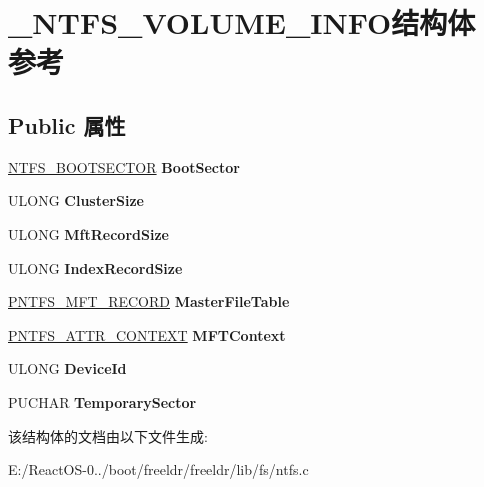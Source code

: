 \hypertarget{struct___n_t_f_s___v_o_l_u_m_e___i_n_f_o}{}\section{\+\_\+\+N\+T\+F\+S\+\_\+\+V\+O\+L\+U\+M\+E\+\_\+\+I\+N\+F\+O结构体 参考}
\label{struct___n_t_f_s___v_o_l_u_m_e___i_n_f_o}
\subsection*{Public 属性}
\begin{DoxyCompactItemize}
\item 
\mbox{\label{struct___n_t_f_s___v_o_l_u_m_e___i_n_f_o_a1f50e40fe047ed091af4987f1a5f62ff}} 
\hyperlink{struct_n_t_f_s___b_o_o_t_s_e_c_t_o_r}{N\+T\+F\+S\+\_\+\+B\+O\+O\+T\+S\+E\+C\+T\+OR} {\bfseries Boot\+Sector}
\item 
\mbox{\label{struct___n_t_f_s___v_o_l_u_m_e___i_n_f_o_a737b6b21c92ce01ef75723857d81515d}} 
U\+L\+O\+NG {\bfseries Cluster\+Size}
\item 
\mbox{\label{struct___n_t_f_s___v_o_l_u_m_e___i_n_f_o_aae548fc3de728c495db76405b8d2fc82}} 
U\+L\+O\+NG {\bfseries Mft\+Record\+Size}
\item 
\mbox{\label{struct___n_t_f_s___v_o_l_u_m_e___i_n_f_o_aed40cec4d44eb49248e21930890c8e4d}} 
U\+L\+O\+NG {\bfseries Index\+Record\+Size}
\item 
\mbox{\label{struct___n_t_f_s___v_o_l_u_m_e___i_n_f_o_a9f636c34358ca9592a69aff47c3c5581}} 
\hyperlink{struct_n_t_f_s___m_f_t___r_e_c_o_r_d}{P\+N\+T\+F\+S\+\_\+\+M\+F\+T\+\_\+\+R\+E\+C\+O\+RD} {\bfseries Master\+File\+Table}
\item 
\mbox{\label{struct___n_t_f_s___v_o_l_u_m_e___i_n_f_o_ac184a861069af2ccdecb8f5418b99773}} 
\hyperlink{struct_n_t_f_s___a_t_t_r___c_o_n_t_e_x_t}{P\+N\+T\+F\+S\+\_\+\+A\+T\+T\+R\+\_\+\+C\+O\+N\+T\+E\+XT} {\bfseries M\+F\+T\+Context}
\item 
\mbox{\label{struct___n_t_f_s___v_o_l_u_m_e___i_n_f_o_ac14bf62be01129bd38366ece09b56280}} 
U\+L\+O\+NG {\bfseries Device\+Id}
\item 
\mbox{\label{struct___n_t_f_s___v_o_l_u_m_e___i_n_f_o_a0acc67f8f47982004c4475c2cd419d66}} 
P\+U\+C\+H\+AR {\bfseries Temporary\+Sector}
\end{DoxyCompactItemize}


该结构体的文档由以下文件生成\+:\begin{DoxyCompactItemize}
\item 
E\+:/\+React\+O\+S-\/0../boot/freeldr/freeldr/lib/fs/ntfs.\+c\end{DoxyCompactItemize}
